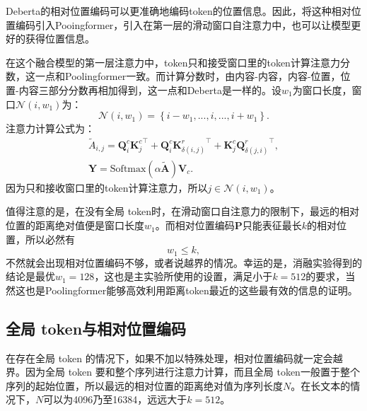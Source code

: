 Deberta的相对位置编码可以更准确地编码token的位置信息。因此，将这种相对位置编码引入Pooingformer，引入在第一层的滑动窗口自注意力中，也可以让模型更好的获得位置信息。

在这个融合模型的第一层注意力中，token只和接受窗口里的token计算注意力分数，这一点和Poolingformer一致。而计算分数时，由内容-内容，内容-位置，位置-内容三部分分数再相加得到，这一点和Deberta是一样的。设$w_1$为窗口长度，窗口$\mathcal{N}{(i,w_1)}$为：
\begin{equation}
    \mathcal{N}{(i,w_1)} = \left\{ i - w_1, ..., i, ..., i + w_1  \right\}.
\label{eq.receptivefield2}
\end{equation}
注意力计算公式为：
\begin{align}
\widetilde{A}_{i,j}=\mathbf{Q}^c_i {\mathbf{K}^c_j}^\top + \mathbf{Q}^c_i {\mathbf{K}^r_{\delta(i,j)}}^\top +  \mathbf{K}^c_j {\mathbf{Q}^r_{\delta(j,i)}}^\top,\\
\mathbf{Y}=\text{Softmax}(\alpha\mathbf{\widetilde{A}})\mathbf{V}_c.
\label{eq:pooldeberta_att}
\end{align}
因为只和接收窗口里的token计算注意力，所以$j \in  \mathcal{N}{(i,w_1)}$。

值得注意的是，在没有全局 token时，在滑动窗口自注意力的限制下，最远的相对位置的距离绝对值便是窗口长度$w_1$。而相对位置编码$\mathbf{P}$只能表征最长$k$的相对位置，所以必然有
\begin{equation}
    w_1\le k,
\label{eq.limit1}
\end{equation}
不然就会出现相对位置编码不够，或者说越界的情况。幸运的是，消融实验得到的结论是最优$w_1=128$，这也是主实验所使用的设置，满足小于$k=512$的要求，当然这也是Poolingformer能够高效利用距离token最近的这些最有效的信息的证明。

\subsection{全局 token与相对位置编码}

在存在全局 token 的情况下，如果不加以特殊处理，相对位置编码就一定会越界。因为全局 token 要和整个序列进行注意力计算，而且全局 token一般置于整个序列的起始位置，所以最远的相对位置的距离绝对值为序列长度$N$。在长文本的情况下，$N$可以为4096乃至16384，远远大于$k=512$。


